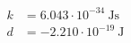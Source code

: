 \begin{align*}\\
k &= 6.043\cdot 10^{-34}~\text{Js}\\
d &= -2.210\cdot 10^{-19}~\text{J}
\\\end{align*}
